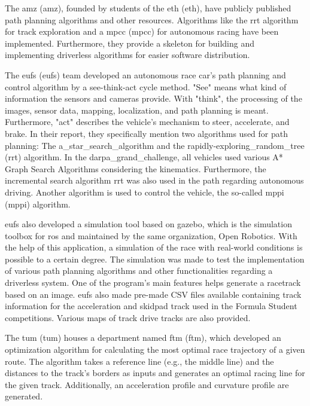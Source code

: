 The \acrlong{amz} (\acrshort{amz}), founded by students of the \acrlong{eth} (\acrshort{eth}), \cite{amz_racing_about} have publicly published path planning algorithms and other resources. Algorithms like the \acrshort{rrt} algorithm for track exploration and a \acrlong{mpcc} (\acrshort{mpcc}) for autonomous racing have been implemented. Furthermore, they provide a skeleton for building and implementing driverless algorithms for easier software distribution. \cite{amz_racing_github}

The \acrlong{eufs} (\acrshort{eufs}) team developed an autonomous race car's path planning and control algorithm by a see-think-act cycle method. "See" means what kind of information the sensors and cameras provide. With "think", the processing of the images, sensor data, mapping, localization, and path planning is meant. Furthermore, "act" describes the vehicle's mechanism to steer, accelerate, and brake. \cite{path_planning_and_control_georgiev}
In their report, they specifically mention two algorithms used for path planning: The \Gls{a_star_search_algorithm} and the \Gls{rapidly-exploring_random_tree} (\acrshort{rrt}) algorithm. In the \Gls{darpa_grand_challenge}, all vehicles used various A* Graph Search Algorithms considering the kinematics. Furthermore, the incremental search algorithm \acrshort{rrt} was also used in the path regarding autonomous driving. \cite{darpa_grand_challenge}
Another algorithm is used to control the vehicle, the so-called \acrlong{mppi} (\acrshort{mppi}) algorithm. \cite{model_predictive_path_integration}

\acrlong{eufs} also developed a simulation tool based on \Gls{gazebo}, which is the simulation toolbox for \acrshort{ros} and maintained by the same organization, Open Robotics. \cite{gazebo_simulator} With the help of this application, a simulation of the race with real-world conditions is possible to a certain degree. The simulation was made to test the implementation of various path planning algorithms and other functionalities regarding a driverless system. One of the program's main features helps generate a racetrack based on an image. \acrshort{eufs} also made pre-made CSV files available containing track information for the acceleration and skidpad track used in the Formula Student competitions. Various maps of track drive tracks are also provided. \cite{eufs_path_planning_and_control} \cite{eufs_sim_gitlab}

The \acrlong{tum} (\acrshort{tum}) houses a department named \acrlong{ftm} (\acrshort{ftm}), which developed an optimization algorithm for calculating the most optimal race trajectory of a given route. The algorithm takes a reference line (e.g., the middle line) and the distances to the track's borders as inputs and generates an optimal racing line for the given track. Additionally, an acceleration profile and curvature profile are generated. \cite{minimum_curvature_trajectory_planning} \cite{minimum_time_trajectory_planning} \cite{tumftm_optimization_algoritm} \cite{tumftm_trajectory_planning_helpers}

